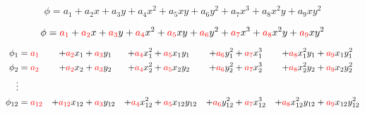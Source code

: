 \documentclass{article}
\begin{document}
\begin{equation*}
	\phi = a_1 + a_2 x + a_3 y + a_4 x^2 + a_5 x y + a_6 y^2 + a_7 x^3 + a_8 x^2 y + a_9 x y^2
\end{equation*}

\begin{equation*}
	\phi = \textcolor{red}{a_1} + \textcolor{red}{a_2} x + 
	\textcolor{red}{a_3} y + \textcolor{red}{a_4} x^2 + 
	\textcolor{red}{a_5} x y + \textcolor{red}{a_6} y^2 + 
	\textcolor{red}{a_7} x^3 + \textcolor{red}{a_8} x^2 y + \textcolor{red}{a_9} x y^2
\end{equation*}

\begin{alignat*}{9}
	\phi_1 &= \textcolor{red}{a_1} &+ \textcolor{red}{a_2} x_1 &+ 
	\textcolor{red}{a_3} y_1 &+ \textcolor{red}{a_4} x_1^2 &+ 
	\textcolor{red}{a_5} x_1 y_1 &+ \textcolor{red}{a_6} y_1^2 &+ 
	\textcolor{red}{a_7} x_1^3 &+ \textcolor{red}{a_8} x_1^2 y_1 &+ \textcolor{red}{a_9} x_1 y_1^2 \\
	\phi_2 &= \textcolor{red}{a_2} &+ \textcolor{red}{a_2} x_2 &+ 
	\textcolor{red}{a_3} y_2 &+ \textcolor{red}{a_4} x_2^2 &+ 
	\textcolor{red}{a_5} x_2 y_2 &+ \textcolor{red}{a_6} y_2^2 &+ 
	\textcolor{red}{a_7} x_2^3 &+ \textcolor{red}{a_8} x_2^2 y_2 &+ \textcolor{red}{a_9} x_2 y_2^2 \\
	\vdots \\
	\phi_{12} &= \textcolor{red}{a_{12}} &+ \textcolor{red}{a_{12}} x_{12} &+ 
	\textcolor{red}{a_3} y_{12} &+ \textcolor{red}{a_4} x_{12}^2 &+ 
	\textcolor{red}{a_5} x_{12} y_{12} &+ \textcolor{red}{a_6} y_{12}^2 &+ 
	\textcolor{red}{a_7} x_{12}^3 &+ \textcolor{red}{a_8} x_{12}^2 y_{12} &+ \textcolor{red}{a_9} x_{12} y_{12}^2 \\
\end{alignat*}

\newpage
\end{document}
